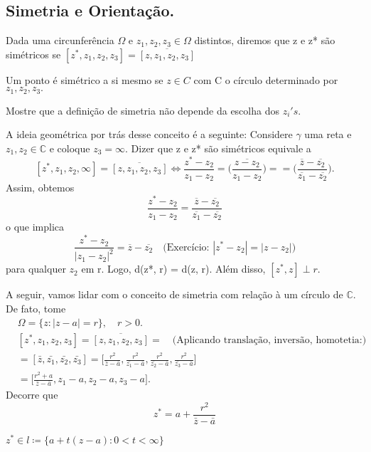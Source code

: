 \documentclass[ComplexAnalysis/complex.tex]{subfiles}
\begin{document}
\subsection{Simetria e Orientação.}
Dada uma circunferência $\Omega\text{ e }z_1, z_2, z_3\in \Omega$ distintos, diremos que z e z* são simétricos se
$[z^*, z_1, z_2, z_3] = \overline{[z, z_1, z_2, z_3]}$
\begin{example}
	Um ponto é simétrico a si mesmo se $z\in{C}$ com C o círculo determinado por $z_1, z_2, z_3.$
\end{example}
\begin{exer*}
	Mostre que a definição de simetria não depende da escolha dos $z_{i}'s.$
\end{exer*}
A ideia geométrica por trás desse conceito é a seguinte: Considere $\gamma$ uma reta e $z_1, z_2\in \mathbb{C}$
e coloque $z_3 = \infty.$ Dizer que z e z* são simétricos equivale a
$$
	[z^*, z_1, z_2, \infty] = \overline{[z, z_1, z_2, z_3]}\Longleftrightarrow \frac{z^* - z_2}{z_1 - z_2} = \overline{\biggl(\frac{z - z_2}{z_1 - z_2}\biggr)} =
	= \biggl(\frac{\overline{z} - \overline{z_2}}{\overline{z_1} - \overline{z_2}}\biggr).
$$
Assim, obtemos
$$
	\frac{z^* - z_2}{z_1 - z_2} = \frac{\overline{z} - \overline{z_2}}{\overline{z_1} - \overline{z_2}}
$$
o que implica
$$
	\frac{z^* - z_2}{|z_1 - z_2|^2} = \overline{z} - \overline{z_2} \quad \text{(Exercício: } |z^* - z_2| = |z - z_2|)
$$
para qualquer $z_2$ em r. Logo, d(z*, r) = d(z, r). Além disso, $[z^*, z]\perp{r}.$

A seguir, vamos lidar com o conceito de simetria com relação à um círculo de $\mathbb{C}.$ De fato, tome
\begin{align*}
	 & \Omega = \{z: |z - a| = r\}, \quad r > 0.                                                                                                                                                     \\
	 & [z^*, z_1, z_2, z_3] = \overline{[z, z_1, z_2, z_3]} = \quad \text{(Aplicando translação, inversão, homotetia:)}                                                                              \\
	 & = [\bar{z}, \bar{z_1}, \bar{z_2}, \bar{z_3}] = \biggl[\frac{r^2}{\bar{z} - \bar{a}}, \frac{r^2}{\bar{z_1} - \bar{a}}, \frac{r^2}{\bar{z_2} - \bar{a}}, \frac{r^2}{\bar{z_3} - \bar{a}}\biggr] \\
	 & = \biggl[\frac{r^2 + a}{\bar{z} - \bar{a}}, z_1 - a, z_2 - a, z_3 - a\biggr].
\end{align*}
Decorre que
$$
	z^* = a + \frac{r^2}{\bar{z} - \bar{a}}
$$
\begin{exer*}
	$z^*\in{l}\coloneqq  \{a + t(z-a): 0 < t < \infty\} $
\end{exer*}
\end{document}
